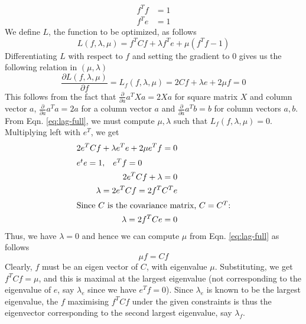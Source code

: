 \documentclass[11pt]{article}
\begin{document}
\begin{enumerate}
\begin{equation}
\begin{split}
f^Tf &= 1 \\
f^Te &= 1
\end{split}
\end{equation}
We define $L$, the function to be optimized, as follows
\begin{equation}
\label{eq:lag-full}
L(f, \lambda, \mu) = f^TCf + \lambda f^Te + \mu(f^Tf - 1)
\end{equation}
Differentiating $L$ with respect to $f$ and setting the gradient to $0$ gives us the following relation in $(\mu, \lambda)$
\begin{equation}
\frac{\partial L(f, \lambda, \mu)}{\partial f} = L_f(f, \lambda, \mu) = 2Cf + \lambda e + 2\mu f = 0
\end{equation}
This follows from the fact that $\frac{\partial}{\partial a}a^TXa = 2Xa$ for square matrix $X$ and column vector $a$, $\frac{\partial}{\partial a}a^Ta = 2a$ for a column vector $a$ and $\frac{\partial}{\partial a}a^Tb = b$ for column vectors $a, b$.\\
\hspace*{1em} From Eqn. \ref{eq:lag-full}, we must compute $\mu, \lambda$ such that $L_f(f, \lambda, \mu) = 0$. Multiplying left with $e^T$, we get
\begin{align}
2e^TCf + \lambda e^Te + 2\mu e^Tf = 0 \\
\shortintertext{$e^te = 1,\;\;\;e^Tf = 0$}
2e^TCf + \lambda = 0 \\
\lambda = 2e^TCf = 2f^TC^Te \\
\shortintertext{Since $C$ is the covariance matrix, $C = C^T$:}
\lambda = 2f^TCe = 0
\end{align}
Thus, we have $\lambda = 0$ and hence we can compute $\mu$ from Eqn. \ref{eq:lag-full} as follows
\begin{equation}
\mu f = Cf
\end{equation}
Clearly, $f$ must be an eigen vector of $C$, with eigenvalue $\mu$. Substituting, we get $f^TCf = \mu$, and this is maximal at the largest eigenvalue (not corresponding to the eigenvalue of $e$, say $\lambda_e$ since we have $e^Tf=0$). Since $\lambda_e$ is known to be the largest eigenvalue, the $f$ maximising $f^TCf$ under the given constraints is thus the eigenvector corresponding to the second largest eigenvalue, say $\lambda_f$.


\end{enumerate}
\end{document}
